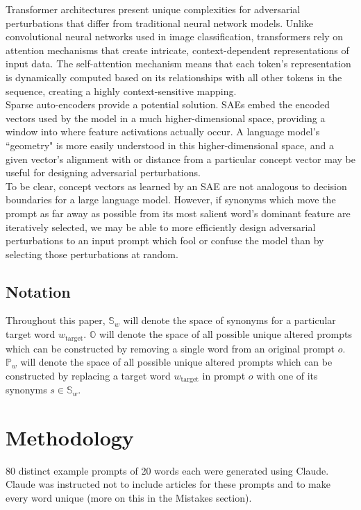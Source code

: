 \documentclass{article}
\begin{document}
Transformer architectures present unique complexities for adversarial perturbations that differ from traditional neural network models. Unlike convolutional neural networks used in image classification, transformers rely on attention mechanisms that create intricate, context-dependent representations of input data. The self-attention mechanism means that each token's representation is dynamically computed based on its relationships with all other tokens in the sequence, creating a highly context-sensitive mapping. \\

Sparse auto-encoders provide a potential solution. SAEs embed the encoded vectors used by the model in a much higher-dimensional space, providing a window into where feature activations actually occur. A language model's ``geometry" is more easily understood in this higher-dimensional space, and a given vector's alignment with or distance from a particular concept vector may be useful for designing adversarial perturbations.\\ 

To be clear, concept vectors as learned by an SAE are not analogous to decision boundaries for a large language model. However, if synonyms which move the prompt as far away as possible from its most salient word's dominant feature are iteratively selected, we may be able to more efficiently design adversarial perturbations to an input prompt which fool or confuse the model than by selecting those perturbations at random. 

\subsection*{Notation}

Throughout this paper, $\mathbb{S}_w$ will denote the space of synonyms for a particular target word $w_\text{target}$.  $\mathbb{O}$ will denote the space of all possible unique altered prompts which can be constructed by removing a single word from an original prompt $o$. $\mathbb{P}_w$ will denote the space of all possible unique altered prompts which can be constructed by replacing a target word $w_\text{target}$ in prompt $o$ with one of its synonyms $s \in \mathbb{S}_w$. 

\section*{Methodology}

80 distinct example prompts of 20 words each were generated using Claude. Claude was instructed not to include articles for these prompts and to make every word unique (more on this in the Mistakes section). \\
\end{document}
